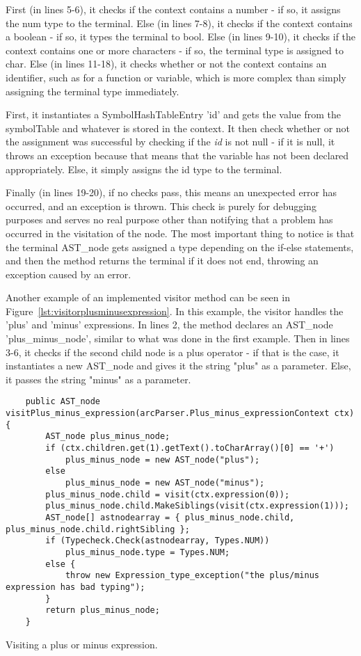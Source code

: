 First (in lines 5-6), it checks if the context contains a number - if so, it assigns the num type to the terminal. Else (in lines 7-8), it checks if the context contains a boolean - if so, it types the terminal to bool. Else (in lines 9-10), it checks if the context contains one or more characters - if so, the terminal type is assigned to char. Else (in lines 11-18), it checks whether or not the context contains an identifier, such as for a function or variable, which is more complex than simply assigning the terminal type immediately.

First, it instantiates a SymbolHashTableEntry 'id' and gets the value from the symbolTable and whatever is stored in the context. It then check whether or not the assignment was successful by checking if the \textit{id} is not null - if it is null, it throws an exception because that means that the variable has not been declared appropriately. Else, it simply assigns the id type to the terminal.

Finally (in lines 19-20), if no checks pass, this means an unexpected error has occurred, and an exception is thrown. This check is purely for debugging purposes and serves no real purpose other than notifying that a problem has occurred in the visitation of the node. The most important thing to notice is that the terminal AST\_node gets assigned a type depending on the if-else statements, and then the method returns the terminal if it does not end, throwing an exception caused by an error.

Another example of an implemented visitor method can be seen in Figure~\ref{lst:visitorplusminusexpression}. In this example, the visitor handles the 'plus' and 'minus' expressions. In lines 2, the method declares an AST\_node 'plus\_minus\_node', similar to what was done in the first example. Then in lines 3-6, it checks if the second child node is a plus operator - if that is the case, it instantiates a new AST\_node and gives it the string "plus" as a parameter. Else, it passes the string "minus" as a parameter.


\begin{listing}[htb!]
    \begin{verbatim}
    public AST_node visitPlus_minus_expression(arcParser.Plus_minus_expressionContext ctx) {
        AST_node plus_minus_node;
        if (ctx.children.get(1).getText().toCharArray()[0] == '+')
            plus_minus_node = new AST_node("plus");
        else
            plus_minus_node = new AST_node("minus");
        plus_minus_node.child = visit(ctx.expression(0));
        plus_minus_node.child.MakeSiblings(visit(ctx.expression(1)));
        AST_node[] astnodearray = { plus_minus_node.child, plus_minus_node.child.rightSibling };
        if (Typecheck.Check(astnodearray, Types.NUM))
            plus_minus_node.type = Types.NUM;
        else {
            throw new Expression_type_exception("the plus/minus expression has bad typing");
        }
        return plus_minus_node;
    }
    \end{verbatim}
    \caption{Visiting a plus or minus expression.}
    \label{lst:visitorplusminusexpression}
\end{listing}


